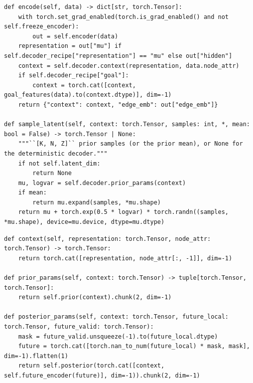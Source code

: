 \documentclass[10pt]{article}
\begin{document}
\par\smallskip{}\par\nopagebreak
\begin{lstlisting}[aboveskip=2pt]
def encode(self, data) -> dict[str, torch.Tensor]:
    with torch.set_grad_enabled(torch.is_grad_enabled() and not self.freeze_encoder):
        out = self.encoder(data)
    representation = out["mu"] if self.decoder_recipe["representation"] == "mu" else out["hidden"]
    context = self.decoder.context(representation, data.node_attr)
    if self.decoder_recipe["goal"]:
        context = torch.cat([context, goal_features(data).to(context.dtype)], dim=-1)
    return {"context": context, "edge_emb": out["edge_emb"]}

def sample_latent(self, context: torch.Tensor, samples: int, *, mean: bool = False) -> torch.Tensor | None:
    """``[K, N, Z]`` prior samples (or the prior mean), or None for the deterministic decoder."""
    if not self.latent_dim:
        return None
    mu, logvar = self.decoder.prior_params(context)
    if mean:
        return mu.expand(samples, *mu.shape)
    return mu + torch.exp(0.5 * logvar) * torch.randn((samples, *mu.shape), device=mu.device, dtype=mu.dtype)
\end{lstlisting}

\par\smallskip{}\par\nopagebreak
\begin{lstlisting}[aboveskip=2pt]
def context(self, representation: torch.Tensor, node_attr: torch.Tensor) -> torch.Tensor:
    return torch.cat([representation, node_attr[:, -1]], dim=-1)

def prior_params(self, context: torch.Tensor) -> tuple[torch.Tensor, torch.Tensor]:
    return self.prior(context).chunk(2, dim=-1)

def posterior_params(self, context: torch.Tensor, future_local: torch.Tensor, future_valid: torch.Tensor):
    mask = future_valid.unsqueeze(-1).to(future_local.dtype)
    future = torch.cat([torch.nan_to_num(future_local) * mask, mask], dim=-1).flatten(1)
    return self.posterior(torch.cat([context, self.future_encoder(future)], dim=-1)).chunk(2, dim=-1)
\end{lstlisting}
\end{document}
